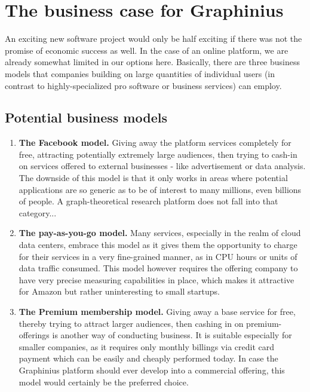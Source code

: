 \chapter{The business case for Graphinius}
\label{ch:business_case}

An exciting new software project would only be half exciting if there was not the promise of economic success as well. In the case of an online platform, we are already somewhat limited in our options here. Basically, there are three business models that companies building on large quantities of individual users (in contrast to highly-specialized pro software or business services) can employ.

\section{Potential business models}
\label{sect:business_model}

\begin{enumerate}
	\item \textbf{The Facebook model.} Giving away the platform services completely for free, attracting potentially extremely large audiences, then trying to cash-in on services offered to external businesses - like advertisement or data analysis. The downside of this model is that it only works in areas where potential applications are so generic as to be of interest to many millions, even billions of people. A graph-theoretical research platform does not fall into that category...
	
	\item \textbf{The pay-as-you-go model.} Many services, especially in the realm of cloud data centers, embrace this model as it gives them the opportunity to charge for their services in a very fine-grained manner, as in CPU hours or units of data traffic consumed. This model however requires the offering company to have very precise measuring capabilities in place, which makes it attractive for Amazon but rather uninteresting to small startups.
	
	\item \textbf{The Premium membership model.} Giving away a base service for free, thereby trying to attract larger audiences, then cashing in on premium-offerings is another way of conducting business. It is suitable especially for smaller companies, as it requires only monthly billings via credit card payment which can be easily and cheaply performed today. In case the Graphinius platform should ever develop into a commercial offering, this model would certainly be the preferred choice.	
\end{enumerate}


